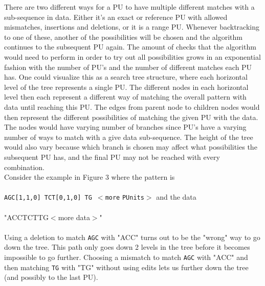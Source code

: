 \documentclass[12pt]{article}
\newcommand{\pu}{PU }
\newcommand{\pus}{PU's }
\newcommand{\pup}{PU. }
\begin{document}
\noindent There are two different ways for a \pu to have multiple different matches with a sub-sequence in data. 
Either it's an exact or reference \pu with allowed mismatches,
insertions and deletions, or it is a range \pup
Whenever backtracking to one of these, another of the possibilities will be chosen and the algorithm continues to the
subsequent \pu again. The amount of checks that the algorithm would need to perform in order to try out
all possibilities grows in an exponential fashion with the number of \pus and the number of different matches each
\pu has. One could visualize this as a search tree structure, 
where each horizontal level of the tree represents a single \pup The different nodes in each horizontal level
then each represent a different way of matching the overall pattern with data until reaching this \pup 
The edges from parent node to children nodes would then represent the different possibilities of matching the given
\pu with the data.
The nodes would have varying number of branches since \pus have a varying number of ways to match with a give data sub-sequence.
The height of the tree would also vary because which branch is chosen may affect what 
possibilities the subsequent \pu has, and the final \pu may not be reached with every combination. \\
Consider the example in Figure 3 where the pattern is \\ \\
\texttt{AGC[1,1,0]\; TCT[0,1,0]\; TG $<$more} \texttt{PUnits}$>$ and the data \\ \\
"ACCTCTTG$<$more data$>$" \\ \\
Using a deletion to match \texttt{AGC} with "ACC" turns out to be the "wrong" way to go down the tree. This path only
goes down 2 levels in the tree before it becomes impossible to go further. Choosing a mismatch to match \texttt{AGC} with "ACC"
and then matching \texttt{TG} with "TG" without using edits lets us further down the tree (and possibly to the last PU). \\
\end{document}
